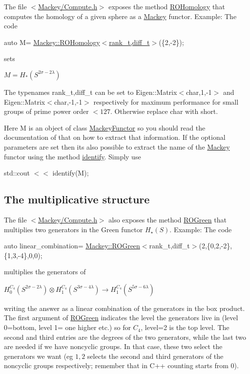 The file {\ttfamily $<$\hyperlink{Compute_8h}{Mackey/\+Compute.\+h}$>$} exposes the method \hyperlink{namespaceMackey_a58708ee937b0c4172b7cde8e5f856504}{R\+O\+Homology} that computes the homology of a given sphere as a \hyperlink{namespaceMackey}{Mackey} functor. Example\+: The code

{\ttfamily  auto M= \hyperlink{namespaceMackey_a58708ee937b0c4172b7cde8e5f856504}{Mackey\+::\+R\+O\+Homology$<$rank\+\_\+t,diff\+\_\+t$>$}(\{2,-\/2\}); }

sets

$ M=H_*(S^{2\sigma-2\lambda})$

The typenames {\ttfamily rank\+\_\+t,diff\+\_\+t} can be set to {\ttfamily Eigen\+::\+Matrix$<$char,1,-\/1$>$} and {\ttfamily Eigen\+::\+Matrix$<$char,-\/1,-\/1$>$} respectively for maximum performance for small groups of prime power order $ <127 $. Otherwise replace {\ttfamily char} with {\ttfamily short}.

Here {\ttfamily M} is an object of class \hyperlink{classMackey_1_1MackeyFunctor}{Mackey\+Functor} so you should read the documentation of that on how to extract that information. If the optional parameters are set then it\textquotesingle{}s also possible to extract the name of the \hyperlink{namespaceMackey}{Mackey} functor using the method \hyperlink{namespaceMackey_a3fa96ba9b7316a92eca2f5c0bd1cca4d}{identify}. Simply use

{\ttfamily  std\+::cout $<$$<$ identify(\+M); }\hypertarget{use_step1mult}{}\subsection{The multiplicative structure}\label{use_step1mult}
The file {\ttfamily $<$\hyperlink{Compute_8h}{Mackey/\+Compute.\+h}$>$} also exposes the method \hyperlink{namespaceMackey_a2bd86833844ca62d76c47a54aeb0bb77}{R\+O\+Green} that multiplies two generators in the Green functor $H_{\star}(S)$. Example\+: The code

{\ttfamily auto linear\+\_\+combination= \hyperlink{namespaceMackey_a2bd86833844ca62d76c47a54aeb0bb77}{Mackey\+::\+R\+O\+Green}$<$rank\+\_\+t,diff\+\_\+t$>$(2,\{0,2,-\/2\},\{1,3,-\/4\},0,0);}

multiplies the generators of

$ H_0^{C_4}(S^{2\sigma-2\lambda}) \otimes H_1^{C_4}(S^{3\sigma-4\lambda}) \to H_1^{C_4}(S^{5\sigma-6\lambda}) $

writing the answer as a linear combination of the generators in the box product. The first argument of \hyperlink{namespaceMackey_a2bd86833844ca62d76c47a54aeb0bb77}{R\+O\+Green} indicates the level the generators live in (level 0=bottom, level 1= one higher etc.) so for $C_4$, level=2 is the top level. The second and third entries are the degrees of the two generators, while the last two are needed if we have noncyclic groups. In that case, these two select the generators we want (eg $1,2$ selects the second and third generators of the noncyclic groups respectively; remember that in C++ counting starts from $0$).

